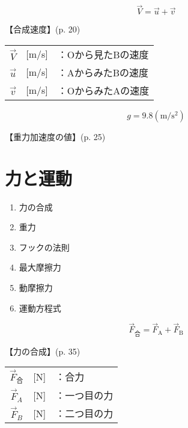 \documentclass[10pt]{jarticle}
\begin{document}
\newpage
\[
	\vec{V} = \vec{u} + \vec{v}
\]


\vskip3mm
【合成速度】{\footnotesize (p. 20)}

\begin{tabular}{ccl}
$\vec{V}$	&[m/s]	&\small ：Oから見たBの速度\\
$\vec{u}$	&[m/s]	&\small ：AからみたBの速度\\
$\vec{v}$	&[m/s]	&\small ：OからみたAの速度
\end{tabular}





\newpage
\[
	g = 9.8  \mathrm{(m/s^2)}
\]


\vskip3mm
【重力加速度の値】{\footnotesize (p. 25)}







\newpage
\addtocounter{page}{-1}
\thispagestyle{empty}
\section{力と運動}

\begin{enumerate}
\setcounter{enumi}{\thepage}
\small
\itemsep-4mm
\item 力の合成\\
\item 重力\\
\item フックの法則\\
\item 最大摩擦力\\
\item 動摩擦力\\
\item 運動方程式
\end{enumerate}



\newpage
\[
	\vec{F}_{合} = \vec{F}_\mathrm{A} + \vec{F}_\mathrm{B}
\]


\vskip3mm
【力の合成】{\footnotesize (p. 35)}

\begin{tabular}{ccl}
$\vec{F}_{合}$	&[N]	&：合力\\
$\vec{F}_{A}$	&[N]	&：一つ目の力\\
$\vec{F}_{B}$	&[N]	&：二つ目の力
\end{tabular}
\end{document}
